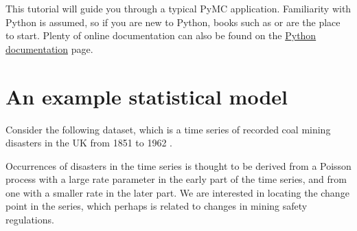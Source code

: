
This tutorial will guide you through a typical PyMC application.
Familiarity with Python is assumed, so if you are new to Python, books such as
\citet{Lutz:2007} or \citet{Langtangen:2009} are the place to start. Plenty of
online documentation can also be found on the
\href{http://www.python.org/doc/}{Python documentation} page.

\section{An example statistical model}
Consider the following dataset, which is a time series of recorded coal mining
disasters in the UK from 1851 to 1962 \citep{Jarrett:1979fr}.
\begin{center}
\end{center}
Occurrences of disasters in the time series is thought to be derived from a Poisson process with a large rate parameter in the early part of the time series, and from one with a smaller rate in the later part. We are interested in locating the change point in the series, which perhaps is related to changes in mining safety regulations.

